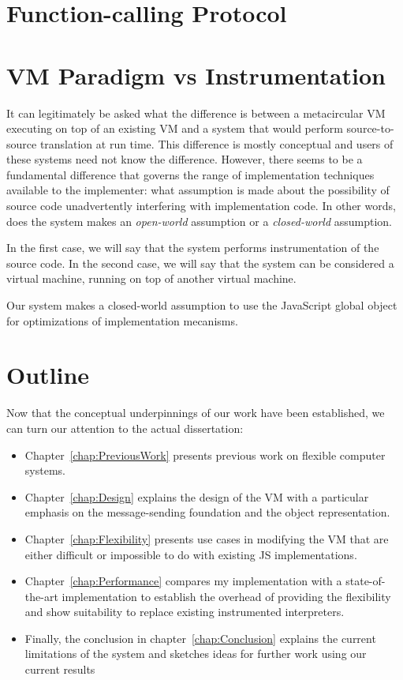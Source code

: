 \section{Function-calling Protocol}

\section{VM Paradigm vs Instrumentation}

It can legitimately be asked what the difference is between a metacircular VM
executing on top of an existing VM and a system that would perform
source-to-source translation at run time. This difference is mostly conceptual
and users of these systems need not know the difference. However, there seems
to be a fundamental difference that governs the range of implementation
techniques available to the implementer: what assumption is made about the
possibility of source code unadvertently interfering with implementation code.
In other words, does the system makes an \textit{open-world} assumption or a
\textit{closed-world} assumption.

In the first case, we will say that the system performs instrumentation of the
source code. In the second case, we will say that the system can be considered
a virtual machine, running on top of another virtual machine. 

Our system makes a closed-world assumption to use the JavaScript global object
for optimizations of implementation mecanisms.

\section{Outline}

Now that the conceptual underpinnings of our work have been established, we can
turn our attention to the actual dissertation: 
\begin{itemize}
    \item Chapter~\ref{chap:PreviousWork} presents previous work on flexible computer systems.
    \item Chapter~\ref{chap:Design} explains the design of the VM with a
        particular emphasis on the message-sending foundation and the object
        representation.
    \item Chapter~\ref{chap:Flexibility} presents use cases in modifying the VM
        that are either difficult or impossible to do with existing JS
        implementations.
    \item Chapter~\ref{chap:Performance} compares my implementation with a
        state-of-the-art implementation to establish the overhead of providing
        the flexibility and show suitability to replace existing instrumented
        interpreters.
    \item Finally, the conclusion in chapter~\ref{chap:Conclusion} explains the
        current limitations of the system and sketches ideas for further work
        using our current results
\end{itemize}
